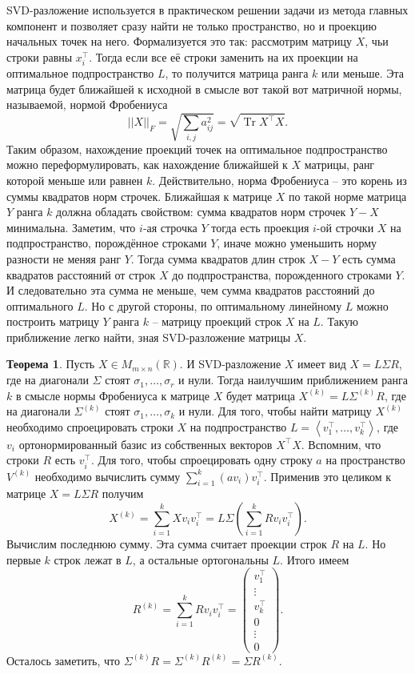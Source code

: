 \documentclass[10pt,a4paper,oneside]{book}
\theoremstyle{definition}
\newtheorem{thm}{{\color{red!40!black} Теорема}}
\newcommand{\mb}[1]{\mathbb{#1}}
\newcommand{\Tr}{\operatorname{Tr}}
\def\lan{\left\langle }
\def\ran{\right\rangle}
\def\thrm{\begin{thm}}
\def\ethrm{\end{thm}}
\def\pmat{\begin{pmatrix}}
\def\epmat{\end{pmatrix}}
\begin{document}
SVD-разложение используется в практическом решении задачи из метода главных компонент и позволяет сразу найти не только пространство, но и проекцию начальных точек на него. Формализуется это так: рассмотрим матрицу $X$, чьи строки равны $x_i^{\top}$. Тогда если все её строки заменить на их проекции на оптимальное подпространство $L$, то получится матрица ранга $k$ или меньше. Эта матрица будет ближайшей к исходной в смысле вот такой вот матричной нормы, называемой, нормой Фробениуса 
$$||X||_F=\sqrt{\sum_{i,j} a_{ij}^2}=\sqrt{\Tr X^{\top}X}.$$
Таким образом, нахождение проекций точек на оптимальное подпространство можно переформулировать, как нахождение ближайшей к $X$ матрицы, ранг которой меньше или равнен $k$. Действительно, норма Фробениуса -- это корень из суммы квадратов норм
строчек. Ближайшая к матрице $X$ по такой норме матрица $Y$
ранга $k$ должна обладать свойством: сумма квадратов норм строчек $Y-X$ минимальна. Заметим, что $i$-ая строчка $Y$ тогда есть проекция $i$-ой строчки $X$ на подпространство, порождённое строками $Y$, иначе можно уменьшить норму разности не меняя ранг $Y$. Тогда сумма квадратов длин строк $X-Y$ есть сумма квадратов расстояний от строк $X$ до подпространства, порожденного строками $Y$. И  следовательно эта сумма не меньше, чем сумма квадратов расстояний до оптимального $L$. Но с другой стороны, по оптимальному линейному $L$ можно построить матрицу $Y$ ранга $k$ -- матрицу проекций строк $X$ на $L$. Такую приближение  легко найти, зная SVD-разложение матрицы $X$.

\thrm Пусть $X\in M_{m\times n}(\mb R)$. И SVD-разложение $X$ имеет вид $X=L\Sigma R$, где на диагонали $\Sigma$ стоят $\sigma_1,\dots,\sigma_r$ и нули. Тогда наилучшим приближением ранга $k$ в смысле нормы Фробениуса к матрице $X$ будет матрица $X^{(k)}=L\Sigma^{(k)}R$, где на диагонали $\Sigma^{(k)}$ стоят $\sigma_1,\dots,\sigma_{k}$ и нули.
\proof Для того, чтобы найти матрицу $X^{(k)}$ необходимо спроецировать строки $X$ на подпространство $L=\lan v_1^{\top},\dots,v_k^{\top}\ran$, где $v_i$ ортонормированный базис из собственных векторов $X^{\top}X$.  Вспомним, что строки $R$ есть $v_i^{\top}$. Для того, чтобы спроецировать одну строку $a$ на пространство $V^{(k)}$ необходимо вычислить сумму $\sum_{i=1}^k (av_i)v_i^{\top}$. Применив это целиком к матрице $X=L\Sigma R$ получим 
$$X^{(k)}=\sum_{i=1}^k Xv_iv_i^{\top}=L\Sigma \left(\sum_{i=1}^k Rv_iv_i^{\top}\right).$$
Вычислим последнюю сумму. Эта сумма считает проекции строк $R$ на $L$. Но первые $k$ строк лежат в $L$, а остальные ортогональны $L$. Итого имеем
$$R^{(k)}=\sum_{i=1}^k Rv_iv_i^{\top} = \pmat v_1^{\top} \\ \vdots \\ v_k^{\top} \\ 0 \\ \vdots \\ 0 \epmat.$$
Осталось заметить, что $\Sigma^{(k)} R= \Sigma^{(k)}R^{(k)}=\Sigma R^{(k)}$.
\endproof
\ethrm 
\end{document}
